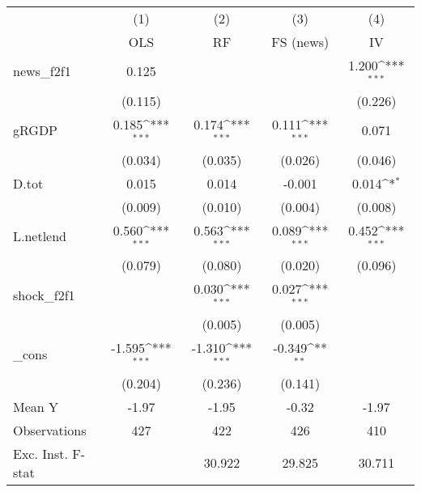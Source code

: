 {
\def\sym#1{\ifmmode^{#1}\else\(^{#1}\)\fi}
\begin{tabular}{l*{4}{c}}
\toprule
            &\multicolumn{1}{c}{(1)}&\multicolumn{1}{c}{(2)}&\multicolumn{1}{c}{(3)}&\multicolumn{1}{c}{(4)}\\
            &\multicolumn{1}{c}{OLS}&\multicolumn{1}{c}{RF}&\multicolumn{1}{c}{FS (news)}&\multicolumn{1}{c}{IV}\\
\midrule
news\_f2f1   &       0.125         &                     &                     &       1.200\sym{***}\\
            &     (0.115)         &                     &                     &     (0.226)         \\
\addlinespace
gRGDP       &       0.185\sym{***}&       0.174\sym{***}&       0.111\sym{***}&       0.071         \\
            &     (0.034)         &     (0.035)         &     (0.026)         &     (0.046)         \\
\addlinespace
D.tot       &       0.015         &       0.014         &      -0.001         &       0.014\sym{*}  \\
            &     (0.009)         &     (0.010)         &     (0.004)         &     (0.008)         \\
\addlinespace
L.netlend   &       0.560\sym{***}&       0.563\sym{***}&       0.089\sym{***}&       0.452\sym{***}\\
            &     (0.079)         &     (0.080)         &     (0.020)         &     (0.096)         \\
\addlinespace
shock\_f2f1  &                     &       0.030\sym{***}&       0.027\sym{***}&                     \\
            &                     &     (0.005)         &     (0.005)         &                     \\
\addlinespace
\_cons      &      -1.595\sym{***}&      -1.310\sym{***}&      -0.349\sym{**} &                     \\
            &     (0.204)         &     (0.236)         &     (0.141)         &                     \\
\midrule
Mean Y      &       -1.97         &       -1.95         &       -0.32         &       -1.97         \\
Observations&         427         &         422         &         426         &         410         \\
Exc. Inst. F-stat&                     &      30.922         &      29.825         &      30.711         \\
\bottomrule
\end{tabular}
}
